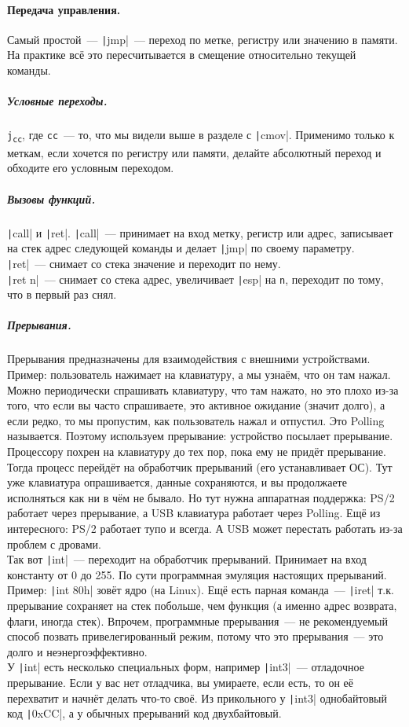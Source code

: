 \documentclass{article}
\begin{document}
    \paragraph{Передача управления.}
    Самый простой~--- \texttt|jmp|~--- переход по метке, регистру или значению в памяти. На практике всё это пересчитывается в смещение относительно текущей команды.
    \subparagraph{Условные переходы.}
    \Verb|j|\textsubscript{\Verb|cc|}, где \Verb|cc|~--- то, что мы видели выше в разделе с \texttt|cmov|. Применимо только к меткам, если хочется по регистру или памяти, делайте абсолютный переход и обходите его условным переходом.
    \subparagraph{Вызовы функций.}
    \texttt|call| и \texttt|ret|. \texttt|call|~--- принимает на вход метку, регистр или адрес, записывает на стек адрес следующей команды и делает \texttt|jmp| по своему параметру.\\
    \texttt|ret|~--- снимает со стека значение и переходит по нему.\\
    \texttt|ret n|~--- снимает со стека адрес, увеличивает \texttt|esp| на \Verb|n|, переходит по тому, что в первый раз снял.
    \subparagraph{Прерывания.}\label{subpar:int}
    Прерывания предназначены для взаимодействия с внешними устройствами. Пример: пользователь нажимает на клавиатуру, а мы узнаём, что он там нажал. Можно периодически спрашивать клавиатуру, что там нажато, но это плохо из-за  того, что если вы часто спрашиваете, это активное ожидание (значит долго), а если редко, то мы пропустим, как пользователь нажал и отпустил. Это Polling называется. Поэтому используем прерывание: устройство посылает прерывание. Процессору похрен на клавиатуру до тех пор, пока ему не придёт прерывание. Тогда процесс перейдёт на обработчик прерываний (его устанавливает ОС). Тут уже клавиатура опрашивается, данные сохраняются, и вы продолжаете исполняться как ни в чём не бывало. Но тут нужна аппаратная поддержка: PS/2 работает через прерывание, а USB клавиатура работает через Polling. Ещё из интересного: PS/2 работает тупо и всегда. А USB может перестать работать из-за проблем с дровами.\\
    Так вот \texttt|int|~--- переходит на обработчик прерываний. Принимает на вход константу от 0 до 255. По сути программная эмуляция настоящих прерываний. Пример: \texttt|int 80h| зовёт ядро (на Linux). Ещё есть парная команда~--- \texttt|iret| т.к. прерывание сохраняет на стек побольше, чем функция (а именно адрес возврата, флаги, иногда стек). Впрочем, программные прерывания~--- не рекомендуемый способ позвать привелегированный режим, потому что это прерывания~--- это долго и неэнергоэффективно.\\
    У \texttt|int| есть несколько специальных форм, например \texttt|int3|~--- отладочное прерывание. Если у вас нет отладчика, вы умираете, если есть, то он её перехватит и начнёт делать что-то своё. Из прикольного у \texttt|int3| однобайтовый код \texttt|0xCC|, а у обычных прерываний код двухбайтовый.
\end{document}

